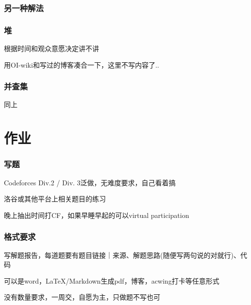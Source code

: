 \documentclass{beamer}
\begin{document}
  \begin{frame}
    \frametitle{另一种解法}
  \end{frame}

  \begin{frame}
    \frametitle{堆}
      根据时间和观众意愿决定讲不讲

      用OI-wiki和写过的博客凑合一下，这里不写内容了..
  \end{frame}

  \begin{frame}
    \frametitle{并查集}
      同上
  \end{frame}

  \section{作业}
  \begin{frame}
    \frametitle{写题}
    Codeforces Div.2 / Div. 3泛做，无难度要求，自己看着搞

    \vspace*{1\baselineskip}
    
    洛谷或其他平台上相关题目的练习

    \vspace*{1\baselineskip}

    晚上抽出时间打CF，如果早睡早起的可以virtual participation
  \end{frame}

  \begin{frame}[fragile]
    \frametitle{格式要求}

    写解题报告，每道题要有题目链接｜来源、解题思路(随便写两句说的对就行)、代码

    \vspace*{1\baselineskip}
    
    可以是word，\LaTeX/Markdown生成pdf，博客，acwing打卡等任意形式

    \vspace*{1\baselineskip}

    没有数量要求，一周交，自愿为主，只做题不写也可
  \end{frame}
\end{document}
